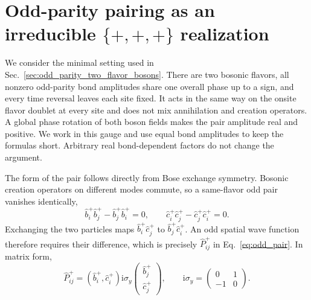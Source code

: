 \documentclass[onecolumn,aps,prb,amsmath,amssymb,superscriptaddress,longbibliography]{revtex4-2}
\newcommand{\ii}{\mathrm{i}}
\begin{document}
\appendix

\section{Odd-parity pairing as an irreducible \texorpdfstring{\(\{+,+,+\}\)}{\{+,+,+\}} realization}
\label{app:two_flavor_odd_pairing}

We consider the minimal setting used in Sec.~\ref{sec:odd_parity_two_flavor_bosons}.  There are two bosonic flavors, all nonzero odd-parity bond amplitudes share one overall phase up to a sign, and every time reversal leaves each site fixed.  It acts in the same way on the onsite flavor doublet at every site and does not mix annihilation and creation operators.  A global phase rotation of both boson fields makes the pair amplitude real and positive.  We work in this gauge and use equal bond amplitudes to keep the formulas short.  Arbitrary real bond-dependent factors do not change the argument.

The form of the pair follows directly from Bose exchange symmetry.  Bosonic creation operators on different modes commute, so a same-flavor odd pair vanishes identically,
\begin{equation}
    \hat b_i^+\hat b_j^+-\hat b_j^+\hat b_i^+=0,
    \qquad
    \hat c_i^+\hat c_j^+-\hat c_j^+\hat c_i^+=0.
    \label{eq:same_flavor_odd_pair_vanishes}
\end{equation}
Exchanging the two particles maps \(\hat b_i^+\hat c_j^+\) to \(\hat b_j^+\hat c_i^+\).  An odd spatial wave function therefore requires their difference, which is precisely \(\hat P_{ij}^+\) in Eq.~\eqref{eq:odd_pair}.  In matrix form,
\begin{equation}
    \hat P_{ij}^+
    =
    (\hat b_i^+,\hat c_i^+)
    \ii\sigma_y
    \begin{pmatrix}\hat b_j^+\\ \hat c_j^+\end{pmatrix},
    \qquad
    \ii\sigma_y=
    \begin{pmatrix}0&1\\-1&0\end{pmatrix}.
    \label{eq:odd_pair_matrix_form}
\end{equation}
\end{document}
